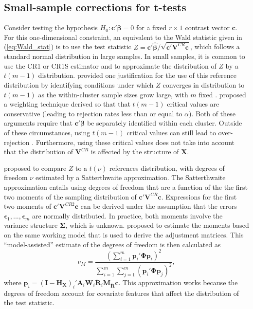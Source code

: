 \documentclass[12pt]{article}\usepackage[]{graphicx}\usepackage[]{color}
\newcommand{\E}{\text{E}}
\newcommand{\Var}{\text{Var}}
\newcommand{\bm}{\mathbf}
\newcommand{\bs}{\boldsymbol}
\begin{document}
\subsection{Small-sample corrections for t-tests}
\label{subsec:t-tests}

Consider testing the hypothesis $H_0: \bm{c}'\bs\beta = 0$ for a fixed $r \times 1$ contrast vector $\bm{c}$. 
For this one-dimensional constraint, an equivalent to the Wald statistic given in (\ref{eq:Wald_stat}) is to use the test statistic $Z = \bm{c}'\bs{\hat\beta} / \sqrt{\bm{c}'\bm{V}^{CR}\bm{c}}$, which follows a standard normal distribution in large samples. 
In small samples, it is common to use the CR1 or CR1S estimator and to approximate the distribution of $Z$ by a $t(m - 1)$ distribution. 
\citet{Hansen2007asymptotic} provided one justification for the use of this reference distribution by identifying conditions under which $Z$ converges in distribution to $t(m-1)$ as the within-cluster sample sizes grow large, with $m$ fixed \citep[see also][]{Donald2007inference}. 
\citet{Ibragimov2010tstatistic} proposed a weighting technique derived so that that $t(m-1)$ critical values are conservative (leading to rejection rates less than or equal to $\alpha$).
Both of these arguments require that $\bm{c}'\bs\beta$ be separately identified within each cluster. 
Outside of these circumstances, using $t(m-1)$ critical values can still lead to over-rejection \citep{Cameron2015practitioners}. 
Furthermore, using these critical values does not take into account that the distribution of $\bm{V}^{CR}$ is affected by the structure of $\bm{X}$. 

\citet{Bell2002bias} proposed to compare $Z$ to a $t(\nu)$ references distribution, with degrees of freedom $\nu$ estimated by a Satterthwaite approximation.
The Satterthwaite approximation \citep{Satterthwaite1946approximate} entails using degrees of freedom that are a function of the the first two moments of the sampling distribution of $\bm{c}' \bm{V}^{CR} \bm{c}$.
Expressions for the first two moments of $\bm{c}'\bm{V}^{CR2}\bm{c}$ can be derived under the assumption that the errors $\bs\epsilon_1,...,\bs\epsilon_m$ are normally distributed. 
In practice, both moments involve the variance structure $\bs\Sigma$, which is unknown. 
\citet{Bell2002bias} proposed to estimate the moments based on the same working model that is used to derive the adjustment matrices. 
This ``model-assisted'' estimate of the degrees of freedom is then calculated as 
\begin{equation}
\label{eq:nu_model}
\nu_{M} = \frac{\left(\sum_{i=1}^m \bm{p}_i' \bs\Phi \bm{p}_i\right)^2}{\sum_{i=1}^m \sum_{j=1}^m \left(\bm{p}_i' \bs\Phi \bm{p}_j\right)^2},
\end{equation}
where $\bm{p}_i = \left(\bm{I} - \bm{H_X}\right)_i'\bm{A}_i \bm{W}_i\bm{\ddot{R}}_i\bm{M_{\ddot{R}}} \bm{c}$.\todo{Can we use $\bm{H_{\ddot{U}}}$ here instead?}
This approximation works because the degrees of freedom account for covariate features that affect the distribution of the test statistic. 
\end{document}
